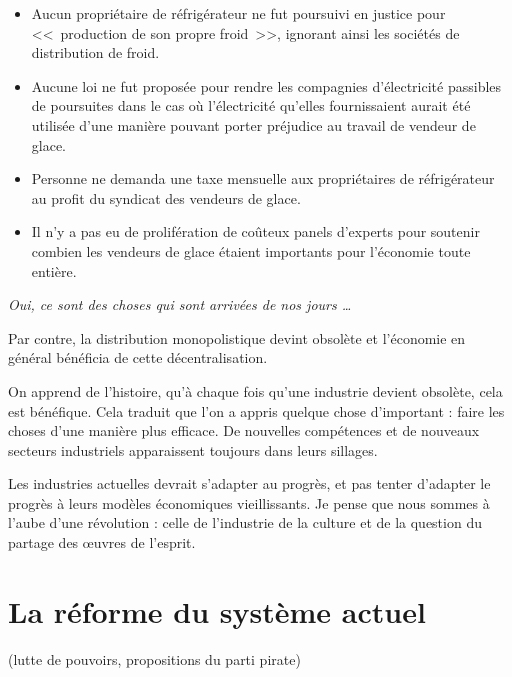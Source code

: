 \begin{itemize}
\item Aucun propriétaire de réfrigérateur ne fut poursuivi en justice pour <<~production de son propre froid~>>, ignorant ainsi les sociétés de distribution de froid.
\item Aucune loi ne fut proposée pour rendre les compagnies d'électricité passibles de poursuites dans le cas où l'électricité qu'elles fournissaient aurait été utilisée d'une manière pouvant porter préjudice au travail de vendeur de glace.
\item Personne ne demanda une taxe mensuelle aux propriétaires de réfrigérateur au profit du syndicat des vendeurs de glace.
\item Il n'y a pas eu de prolifération de coûteux panels d'experts pour soutenir combien les vendeurs de glace étaient importants pour l'économie toute entière.
\end{itemize}

\textit{Oui, ce sont des choses qui sont arrivées de nos jours \dots{}}

Par contre, la distribution monopolistique devint obsolète et l'économie en général bénéficia de cette décentralisation.

On apprend de l'histoire, qu'à chaque fois qu'une industrie devient obsolète, cela est bénéfique.
Cela traduit que l'on a appris quelque chose d'important : faire les choses d'une manière plus efficace.
De nouvelles compétences et de nouveaux secteurs industriels apparaissent toujours dans leurs sillages.

Les industries actuelles devrait s'adapter au progrès, et pas tenter d'adapter le progrès à leurs modèles économiques vieillissants.
Je pense que nous sommes à l'aube d'une révolution : celle de l'industrie de la culture et de la question du partage des œuvres de l'esprit.

\section{La réforme du système actuel}
(lutte de pouvoirs, propositions du parti pirate)


